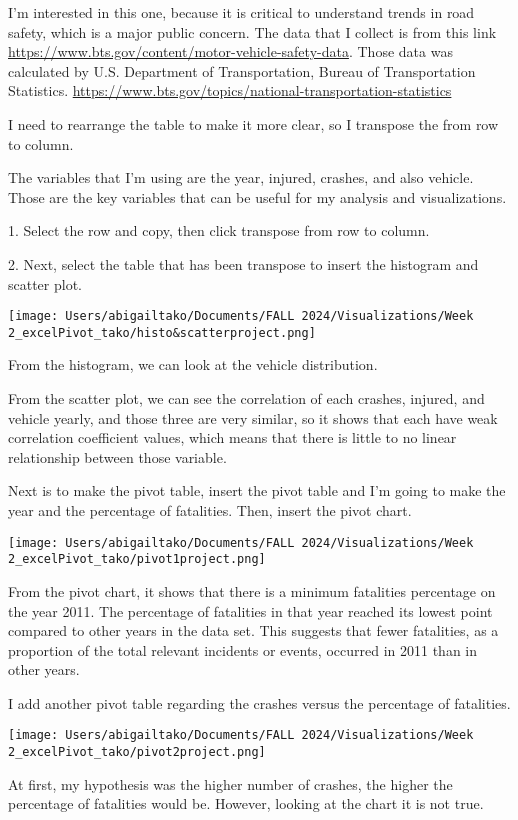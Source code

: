 \documentclass[
  letterpaper,
  DIV=11,
  numbers=noendperiod]{scrreprt}
\begin{document}
I'm interested in this one, because it is critical to understand trends
in road safety, which is a major public concern. The data that I collect
is from this link
\url{https://www.bts.gov/content/motor-vehicle-safety-data}. Those data
was calculated by U.S. Department of Transportation, Bureau of
Transportation Statistics.
\url{https://www.bts.gov/topics/national-transportation-statistics}

I need to rearrange the table to make it more clear, so I transpose the
from row to column.

The variables that I'm using are the year, injured, crashes, and also
vehicle. Those are the key variables that can be useful for my analysis
and visualizations.

1. Select the row and copy, then click transpose from row to column.

2. Next, select the table that has been transpose to insert the
histogram and scatter plot.

\texttt{[image: Users/abigailtako/Documents/FALL 2024/Visualizations/Week 2\_excelPivot\_tako/histo\&scatterproject.png]}

From the histogram, we can look at the vehicle distribution.

From the scatter plot, we can see the correlation of each crashes,
injured, and vehicle yearly, and those three are very similar, so it
shows that each have weak correlation coefficient values, which means
that there is little to no linear relationship between those variable.

Next is to make the pivot table, insert the pivot table and I'm going to
make the year and the percentage of fatalities. Then, insert the pivot
chart.

\texttt{[image: Users/abigailtako/Documents/FALL 2024/Visualizations/Week 2\_excelPivot\_tako/pivot1project.png]}

From the pivot chart, it shows that there is a minimum fatalities
percentage on the year 2011. The percentage of fatalities in that year
reached its lowest point compared to other years in the data set. This
suggests that fewer fatalities, as a proportion of the total relevant
incidents or events, occurred in 2011 than in other years.

I add another pivot table regarding the crashes versus the percentage of
fatalities.

\texttt{[image: Users/abigailtako/Documents/FALL 2024/Visualizations/Week 2\_excelPivot\_tako/pivot2project.png]}

At first, my hypothesis was the higher number of crashes, the higher the
percentage of fatalities would be. However, looking at the chart it is
not true.
\end{document}
